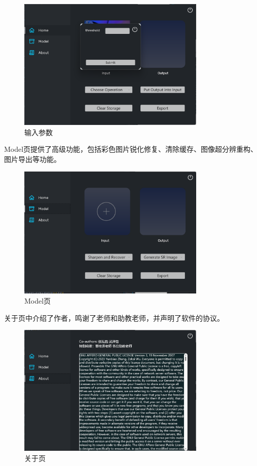 \documentclass[UTF8,openany]{ctexbook}
\begin{document}
\begin{figure}[H]
  \centering
  \includegraphics[width=0.8\textwidth]{img/image-4.png}
  \caption{输入参数}
\end{figure}


Model页提供了高级功能，包括彩色图片锐化修复、清除缓存、图像超分辨重构、图片导出等功能。

\begin{figure}[H]
  \centering
  \includegraphics[width=0.8\textwidth]{img/image-1.png}
  \caption{Model页}
\end{figure}

关于页中介绍了作者，鸣谢了老师和助教老师，并声明了软件的协议。

\begin{figure}[H]
  \centering
  \includegraphics[width=0.8\textwidth]{img/image-2.png}
  \caption{关于页}
\end{figure}
\end{document}
